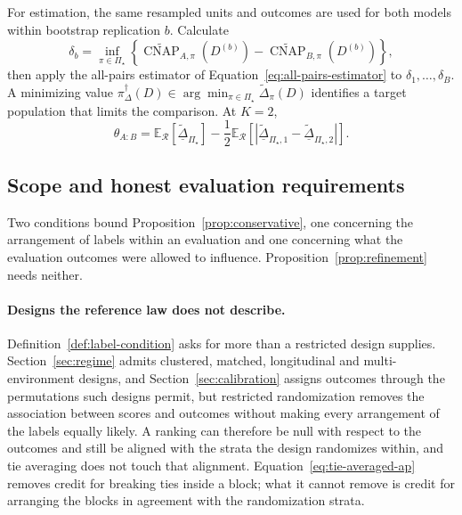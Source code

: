 \documentclass[11pt]{article}
\newcommand{\CNAP}{\operatorname{CNAP}}
\newcommand{\Regime}{\mathcal{R}}
\newcommand{\PSet}{\Pi_\star}
\newcommand{\E}{\mathbb{E}}
\newcommand{\CNAPta}{\widetilde{\CNAP}}
\newcommand{\Dta}{\widetilde{\Delta}}
\newcommand{\RobDta}{\underline{\widetilde{\Delta}}_{\PSet}}
\theoremstyle{remark}
\begin{document}
For estimation, the same resampled units and outcomes are used for both models within bootstrap replication $b$. Calculate
\[
\delta_b
=
\inf_{\pi\in\PSet}
\left\{
\CNAPta_{A,\pi}(D^{(b)})
-
\CNAPta_{B,\pi}(D^{(b)})
\right\},
\]
then apply the all-pairs estimator of Equation~\eqref{eq:all-pairs-estimator} to $\delta_1,\ldots,\delta_B$. A minimizing value $\pi_\Delta^\dagger(D)\in\arg\min_{\pi\in\PSet}\Dta_\pi(D)$ identifies a target population that limits the comparison. At $K=2$,
\begin{equation}
\theta_{A:B}
=
\E_{\Regime}[\RobDta]
-
\frac12
\E_{\Regime}
\left[
|\underline{\widetilde{\Delta}}_{\PSet,1}-\underline{\widetilde{\Delta}}_{\PSet,2}|
\right].
\label{eq:robust-paired-k2}
\end{equation}

\subsection{Scope and honest evaluation requirements}
\label{sec:paired-scope}

Two conditions bound Proposition~\ref{prop:conservative}, one concerning the arrangement of labels within an evaluation and one concerning what the evaluation outcomes were allowed to influence. Proposition~\ref{prop:refinement} needs neither.

\paragraph{Designs the reference law does not describe.}
Definition~\ref{def:label-condition} asks for more than a restricted design supplies. Section~\ref{sec:regime} admits clustered, matched, longitudinal and multi-environment designs, and Section~\ref{sec:calibration} assigns outcomes through the permutations such designs permit, but restricted randomization removes the association between scores and outcomes without making every arrangement of the labels equally likely. A ranking can therefore be null with respect to the outcomes and still be aligned with the strata the design randomizes within, and tie averaging does not touch that alignment. Equation~\eqref{eq:tie-averaged-ap} removes credit for breaking ties inside a block; what it cannot remove is credit for arranging the blocks in agreement with the randomization strata.
\end{document}
